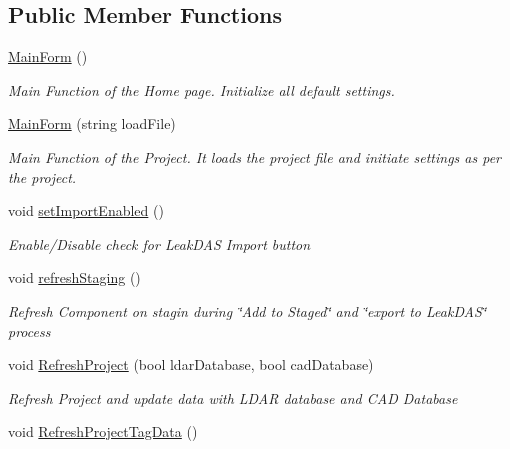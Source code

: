 \subsection*{Public Member Functions}
\begin{DoxyCompactItemize}
\item 
\hyperlink{class_env_int_1_1_win32_1_1_field_tech_1_1_manager_1_1_main_form_aef566b5276884629c426e9af18d9b80c}{Main\+Form} ()
\begin{DoxyCompactList}\small\item\em Main Function of the Home page. Initialize all default settings. \end{DoxyCompactList}\item 
\hyperlink{class_env_int_1_1_win32_1_1_field_tech_1_1_manager_1_1_main_form_a1ec1af630dec4fe1c175d63a00df8398}{Main\+Form} (string load\+File)
\begin{DoxyCompactList}\small\item\em Main Function of the Project. It loads the project file and initiate settings as per the project. \end{DoxyCompactList}\item 
void \hyperlink{class_env_int_1_1_win32_1_1_field_tech_1_1_manager_1_1_main_form_aebda61218e16629b197f3f734785bc1a}{set\+Import\+Enabled} ()
\begin{DoxyCompactList}\small\item\em Enable/\+Disable check for Leak\+D\+A\+S Import button \end{DoxyCompactList}\item 
void \hyperlink{class_env_int_1_1_win32_1_1_field_tech_1_1_manager_1_1_main_form_a3e7e74dd0f0dd33adcdd55d2c8428dfc}{refresh\+Staging} ()
\begin{DoxyCompactList}\small\item\em Refresh Component on stagin during \char`\"{}\+Add to Staged\char`\"{} and \char`\"{}export to Leak\+D\+A\+S\char`\"{} process \end{DoxyCompactList}\item 
void \hyperlink{class_env_int_1_1_win32_1_1_field_tech_1_1_manager_1_1_main_form_a8e016a710e8531d2ebd02a2d9eb594b7}{Refresh\+Project} (bool ldar\+Database, bool cad\+Database)
\begin{DoxyCompactList}\small\item\em Refresh Project and update data with L\+D\+A\+R database and C\+A\+D Database \end{DoxyCompactList}\item 
void \hyperlink{class_env_int_1_1_win32_1_1_field_tech_1_1_manager_1_1_main_form_ae29a53b7a0cfdedb8196c046493d5e34}{Refresh\+Project\+Tag\+Data} ()

\end{DoxyCompactItemize}
